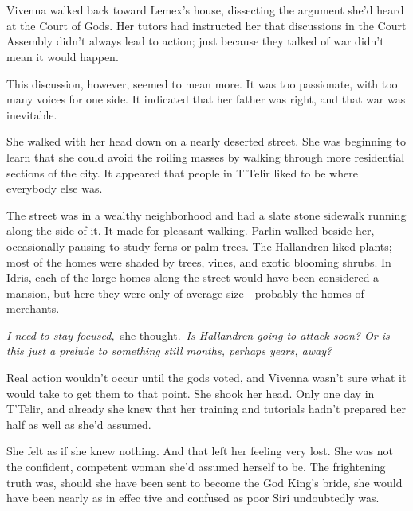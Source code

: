 \chapter{}

Vivenna walked back toward Lemex’s house, dissecting the argument she’d heard at the Court of Gods. Her tutors had instructed her that discussions in the Court Assembly didn’t always lead to action; just because they talked of war didn’t mean it would happen.

This discussion, however, seemed to mean more. It was too passionate, with too many voices for one side. It indicated that her father was right, and that war was inevitable.

She walked with her head down on a nearly deserted street. She was beginning to learn that she could avoid the roiling masses by walking through more residential sections of the city. It appeared that people in T’Telir liked to be where everybody else was.

The street was in a wealthy neighborhood and had a slate stone sidewalk running along the side of it. It made for pleasant walking. Parlin walked beside her, occasionally pausing to study ferns or palm trees. The Hallandren liked plants; most of the homes were shaded by trees, vines, and exotic blooming shrubs. In Idris, each of the large homes along the street would have been considered a mansion, but here they were only of average size—probably the homes of merchants.

\textit{I need to stay focused,}~she thought.~\textit{Is Hallandren going to attack soon? Or is this just a prelude to something still months, perhaps years, away?}

Real action wouldn’t occur until the gods voted, and Vivenna wasn’t sure what it would take to get them to that point. She shook her head. Only one day in T’Telir, and already she knew that her training and tutorials hadn’t prepared her half as well as she’d assumed.

She felt as if she knew nothing. And that left her feeling very lost. She was not the confident, competent woman she’d assumed herself to be. The frightening truth was, should she have been sent to become the God King’s bride, she would have been nearly as in effec tive and confused as poor Siri undoubtedly was.

